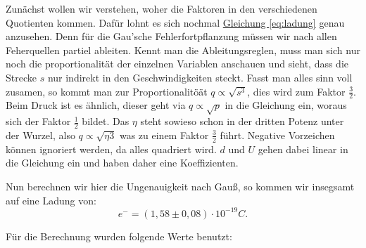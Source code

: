 Zunächst wollen wir verstehen, woher die Faktoren in den verschiedenen Quotienten kommen. Dafür lohnt es sich nochmal \hyperref[eq:ladung]{Gleichung \ref*{eq:ladung}} genau anzusehen. Denn für die Gau'sche Fehlerfortpflanzung müssen wir nach allen Feherquellen partiel ableiten. 
Kennt man die Ableitungsreglen, muss man sich nur noch die proportionalität der einzelnen Variablen anschauen und sieht, dass die Strecke $s$ nur indirekt in den Geschwindigkeiten steckt. Fasst man alles sinn voll zusamen, so kommt man zur Proportionalitöät $q \propto \sqrt{s^3}$, dies wird zum Faktor $\frac{3}{2}$.
Beim Druck ist es ähnlich, dieser geht via $q \propto \sqrt{p}$ in die Gleichung ein, woraus sich der Faktor $\frac{1}{2}$ bildet.
Das $\eta$ steht sowieso schon in der dritten Potenz unter der Wurzel, also $q \propto \sqrt{\eta 3}$ was zu einem Faktor $\frac{3}{2}$ führt.
Negative Vorzeichen können ignoriert werden, da alles quadriert wird. $d$ und $U$ gehen dabei linear in die Gleichung ein und haben daher eine Koeffizienten. 

Nun berechnen wir hier die Ungenauigkeit nach Gauß, so kommen wir insegsamt auf eine Ladung von:
\begin{equation}
    \boxed{e^- = (1,58 \pm 0,08) \cdot 10^{-19}C}.
\end{equation}

Für die Berechnung wurden folgende Werte benutzt:


